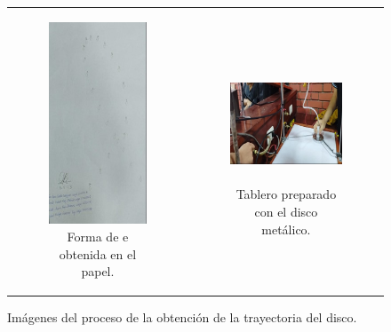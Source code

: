 \documentclass[../main.tex]{subfiles}
\begin{document}
\begin{figure}[H]

  \begin{tabular}{c c}
      
  \begin{subfigure}{0.5\textwidth} 
      \centering
      \includegraphics[width=0.4\linewidth,angle=90]{images/proc1.jpg}
      \caption{Forma de e obtenida en el papel.}
      \label{fig:e}
  \end{subfigure}
  &
  \begin{subfigure}{0.5\textwidth}  
      \centering
      \includegraphics[width=0.8\linewidth, height=3.5cm]{images/proc2.jpg}
      \caption{Tablero preparado con el disco metálico.}
      \label{fig:proc_disco}
  \end{subfigure} \\
  \end{tabular}
  
  \caption{Imágenes del proceso de la obtención de la trayectoria del disco.}
  \label{fig:proc}
\end{figure}
\end{document}
